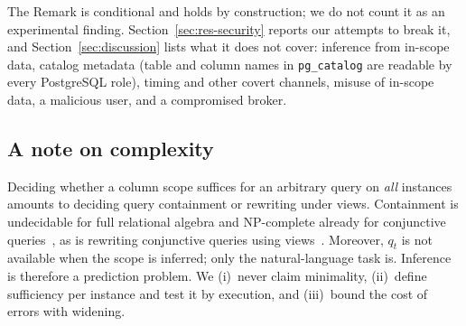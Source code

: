 The Remark is conditional and holds by construction; we do not count it as an experimental finding.
Section~\ref{sec:res-security} reports our attempts to break it, and Section~\ref{sec:discussion} lists
what it does not cover: inference from in-scope data, catalog metadata (table and column names in
\texttt{pg\_catalog} are readable by every PostgreSQL role), timing and other covert channels, misuse of
in-scope data, a malicious user, and a compromised broker.

\subsection{A note on complexity}
\label{sec:complexity}
Deciding whether a column scope suffices for an arbitrary query on \emph{all} instances amounts to deciding
query containment or rewriting under views. Containment is undecidable for full relational algebra and
NP-complete already for conjunctive queries~\cite{chandra1977optimal}, as is rewriting conjunctive queries
using views~\cite{levy1995answering,halevy2001answering}. Moreover, $q_t$ is not available when the scope
is inferred; only the natural-language task is. Inference is therefore a prediction problem. We
(i)~never claim minimality, (ii)~define sufficiency per instance and test it by execution, and (iii)~bound
the cost of errors with widening.
